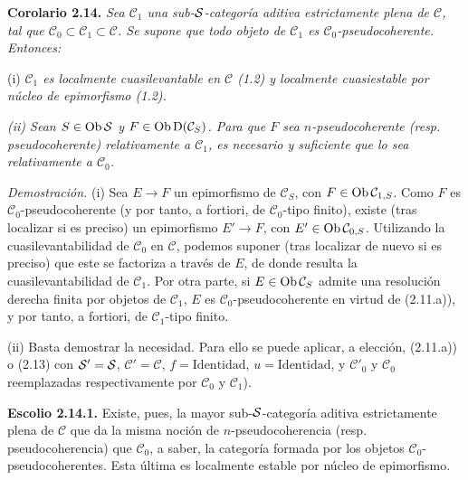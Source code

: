 \textbf{Corolario 2.14.} \emph{Sea \(\mathcal C_1\) una sub-\(\sisi{S}{\mathcal S}\)-categoría aditiva estrictamente plena de \(\mathcal C\), tal que \(\mathcal C_0\subset\mathcal C_1\subset\mathcal C\). Se supone que todo objeto de \(\mathcal C_1\) es \(\mathcal C_0\)-pseudocoherente. Entonces:}

(i) \emph{\(\mathcal C_1\) es localmente cuasilevantable en \(\mathcal C\) (1.2) y localmente cuasiestable por núcleo de epimorfismo (1.2).}

\emph{(ii) Sean \(S\in\Ob \sisi{S}{\mathcal S}\) y \(F\in\Ob\Dpx(\mathcal C_S)\). Para que \(F\) sea \(n\)-pseudocoherente (resp. pseudocoherente) relativamente a \(\mathcal C_1\), es necesario y suficiente que lo sea relativamente a \(\mathcal C_0\).}

\emph{Demostración.} (i) Sea \(E\to F\) un epimorfismo de \(\mathcal C_S\), con \(F\in\Ob\mathcal C_{1,S}\). Como \(F\) es \(\mathcal C_0\)-pseudocoherente (y por tanto, a fortiori, de \(\mathcal C_0\)-tipo finito), existe (tras localizar si es preciso) un epimorfismo \(E'\to F\), con \(E'\in\Ob\mathcal C_{0,S}\). Utilizando la cuasilevantabilidad de \(\mathcal C_0\) en \(\mathcal C\), podemos suponer (tras localizar de nuevo si es preciso) que este se factoriza a través de \(E\), de donde resulta la cuasilevantabilidad de \(\mathcal C_1\). Por otra parte, si \(E\in\Ob\mathcal C_S\) admite una resolución derecha finita por objetos de \(\mathcal C_1\), \(E\) es \(\mathcal C_0\)-pseudocoherente en virtud de (2.11.a)), y por tanto, a fortiori, de \(\mathcal C_1\)-tipo finito.

(ii) Basta demostrar la necesidad. Para ello se puede aplicar, a elección, (2.11.a)) o (2.13) con \(\sisi{S'}{\mathcal S'}=\sisi{S}{\mathcal S}\), \(\mathcal C'=\mathcal C\), \(f=\text{Identidad}\), \(u=\text{Identidad}\), y \(\mathcal C'_0\) y \(\mathcal C_0\) reemplazadas respectivamente por \(\mathcal C_0\) y \(\mathcal C_1\)).

\textbf{Escolio 2.14.1.} Existe, pues, la mayor sub-\(\sisi{S}{\mathcal S}\)-categoría aditiva estrictamente plena de \(\mathcal C\) que da la misma noción de \(n\)-pseudocoherencia (resp. pseudocoherencia) que \(\mathcal C_0\), a saber, la categoría formada por los objetos \(\mathcal C_0\)-pseudocoherentes. Esta última es localmente estable por núcleo de epimorfismo.

